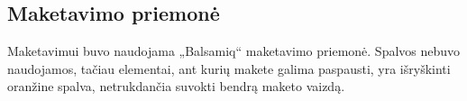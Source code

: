 \documentclass{VUMIFPSkursinis}
\begin{document}
\subsection{Maketavimo priemonė}
Maketavimui buvo naudojama „Balsamiq“ maketavimo priemonė. Spalvos nebuvo naudojamos, tačiau elementai, ant kurių makete galima paspausti, yra išryškinti oranžine spalva, netrukdančia suvokti bendrą maketo vaizdą.
























\printbibliography[heading=bibintoc, title=Šaltiniai]  %
\end{document}
